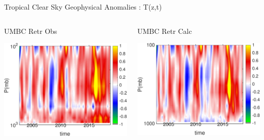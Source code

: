 \documentclass[10pt,t]{beamer}
\begin{document}
\begin{frame}{Tropical Clear Sky Geophysical Anomalies : T(z,t)}
\begin{columns}
\begin{column}{0.45\columnwidth}
\begin{block}{\footnotesize UMBC Retr Obs}
\vspace{-0.1in}
\begin{center}
\includegraphics[width=\linewidth]{Figs/ClearAnom/umbc_clr_retr_obs_ptemp_anom_200209_201808.png}
\end{center}
\end{block}
\end{column}

\begin{column}{0.45\columnwidth}
\begin{block}{\footnotesize UMBC Retr Calc}
\vspace{-0.1in}
\begin{center}
\includegraphics[width=\linewidth]{Figs/ClearAnom/umbc_clr_retr_cal_ptemp_anom_200209_201808.png}
\end{center}
\end{block}
\end{column}
\end{columns}

\end{frame}
\end{document}
